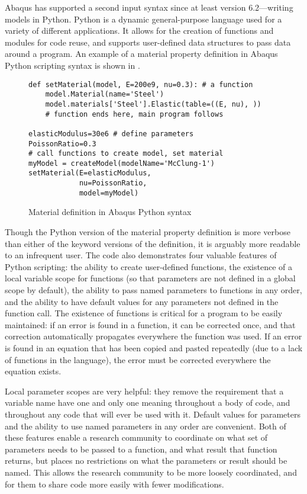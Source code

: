 Abaqus has supported a second input syntax since at least version 6.2---writing models in Python.
Python is a dynamic general-purpose language used for a variety of different applications.
It allows for the creation of functions and modules for code reuse, and supports user-defined data structures to pass data around a program.
An example of a material property definition in Abaqus Python scripting syntax is shown in .
\begin{figure}[bp]
\begin{lstlisting}
def setMaterial(model, E=200e9, nu=0.3): # a function
    model.Material(name='Steel')
    model.materials['Steel'].Elastic(table=((E, nu), ))
    # function ends here, main program follows

elasticModulus=30e6 # define parameters
PoissonRatio=0.3
# call functions to create model, set material
myModel = createModel(modelName='McClung-1')
setMaterial(E=elasticModulus,
            nu=PoissonRatio,
            model=myModel)
\end{lstlisting}
\caption{Material definition in Abaqus Python syntax \label{fig:material-abaqus-python}}
\end{figure}

Though the Python version of the material property definition is more verbose than either of the keyword versions of the definition, it is arguably more readable to an infrequent user.
The code also demonstrates four valuable features of Python scripting: the ability to create user-defined functions, the existence of a local variable scope for functions (so that parameters are not defined in a global scope by default), the ability to pass named parameters to functions in any order, and the ability to have default values for any parameters not defined in the function call.
The existence of functions is critical for a program to be easily maintained: if an error is found in a function, it can be corrected once, and that correction automatically propagates everywhere the function was used.
If an error is found in an equation that has been copied and pasted repeatedly (due to a lack of functions in the language), the error must be corrected everywhere the equation exists.

Local parameter scopes are very helpful: they remove the requirement that a variable name have one and only one meaning throughout a body of code, and throughout any code that will ever be used with it.
Default values for parameters and the ability to use named parameters in any order are convenient.
Both of these features enable a research community to coordinate on what set of parameters needs to be passed to a function, and what result that function returns, but places no restrictions on what the parameters or result should be named.
This allows the research community to be more loosely coordinated, and for them to share code more easily with fewer modifications.

